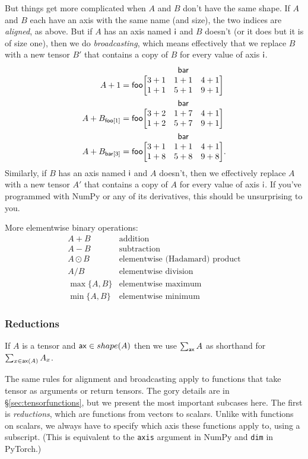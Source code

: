 \documentclass{article}
\makeatletter
\newcommand{\nmatrix}[3]{\name{#1}\begin{array}[b]{@{}c@{}}\name{#2}\\\begin{bmatrix}#3\end{bmatrix}\end{array}}
\makeatother
\begin{document}
But things get more complicated when $A$ and $B$ don't have the same shape. If $A$ and $B$ each have an axis with the same name (and size), the two indices are \emph{aligned}, as above. But if $A$ has an axis named $\mathsf{i}$ and $B$ doesn't (or it does but it is of size one), then we do \emph{broadcasting}, which means effectively that we replace $B$ with a new tensor $B'$ that contains a copy of $B$ for every value of axis $\mathsf{i}$. 
\begin{align*}
A + 1 &= \nmatrix{foo}{bar}{
  3+1 & 1+1 & 4+1 \\
  1+1 & 5+1 & 9+1
} \\
A + B_{\nidx{foo}{1}} &= \nmatrix{foo}{bar}{
  3+2 & 1+7 & 4+1 \\
  1+2 & 5+7 & 9+1
} \\
A + B_{\nidx{bar}{3}} &= \nmatrix{foo}{bar}{
  3+1 & 1+1 & 4+1 \\
  1+8 & 5+8 & 9+8
}.
\end{align*}
Similarly, if $B$ has an axis named $\mathsf{i}$ and $A$ doesn't, then we effectively replace $A$ with a new tensor $A'$ that contains a copy of $A$ for every value of axis $\mathsf{i}$. If you've programmed with NumPy or any of its derivatives, this should be unsurprising to you.

More elementwise binary operations:
\[\begin{array}{cl}
A+B & \text{addition} \\
A-B & \text{subtraction} \\
A\odot B & \text{elementwise (Hadamard) product} \\
A / B & \text{elementwise division} \\
\max \{A, B\} & \text{elementwise maximum} \\
\min \{A, B\} & \text{elementwise minimum}
\end{array}\]

\subsubsection{Reductions}


If $A$ is a tensor and $\mathsf{ax} \in shape(A)$ then we use $\sum_{\mathsf{ax}} A$ as shorthand for $\sum_{x \in \mathsf{ax}(A)} A_x$.

The same rules for alignment and broadcasting apply to functions that take tensor as arguments or return tensors.  The gory details are in \S\ref{sec:tensorfunctions}, but we present the most important subcases here. The first is \emph{reductions}, which are functions from vectors to scalars. Unlike with functions on scalars, we always have to specify which axis these functions apply to, using a subscript. (This is equivalent to the \verb|axis| argument in NumPy and \verb|dim| in PyTorch.)
\end{document}
